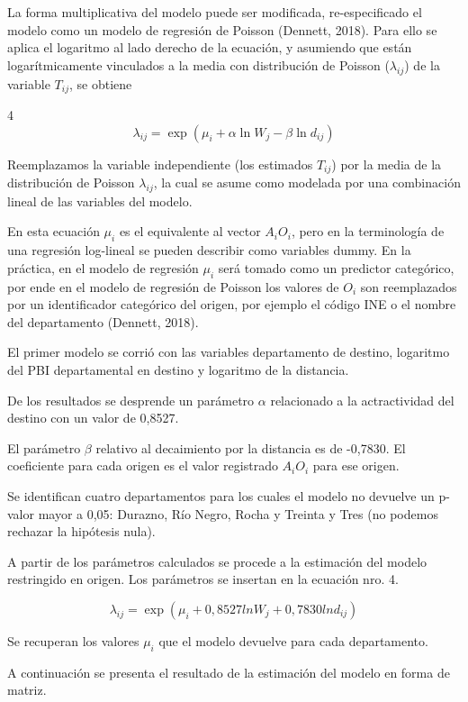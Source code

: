 \documentclass[12pt,spanish,]{article}
\begin{document}
La forma multiplicativa del modelo puede ser modificada, re-especificado
el modelo como un modelo de regresión de Poisson (Dennett, 2018). Para
ello se aplica el logaritmo al lado derecho de la ecuación, y asumiendo
que están logarítmicamente vinculados a la media con distribución de
Poisson (\(\lambda_{ij}\)) de la variable \(T_{ij}\), se obtiene

4
\[ \lambda_{ij} = \exp( \mu_{i} + \alpha \ln W_{j} - \beta \ln d_{ij} )\]

Reemplazamos la variable independiente (los estimados \(T_{ij}\)) por la
media de la distribución de Poisson \(\lambda_{ij}\), la cual se asume
como modelada por una combinación lineal de las variables del modelo.

En esta ecuación \(\mu_{i}\) es el equivalente al vector \(A_{i}O_{i}\),
pero en la terminología de una regresión log-lineal se pueden describir
como variables dummy. En la práctica, en el modelo de regresión
\(\mu_{i}\) será tomado como un predictor categórico, por ende en el
modelo de regresión de Poisson los valores de \(O_{i}\) son reemplazados
por un identificador categórico del origen, por ejemplo el código INE o
el nombre del departamento (Dennett, 2018).

El primer modelo se corrió con las variables departamento de destino,
logaritmo del PBI departamental en destino y logaritmo de la distancia.



De los resultados se desprende un parámetro \(\alpha\) relacionado a la
actractividad del destino con un valor de 0,8527.

El parámetro \(\beta\) relativo al decaimiento por la distancia es de
-0,7830. El coeficiente para cada origen es el valor registrado
\(A_{i}O_{i}\) para ese origen.

Se identifican cuatro departamentos para los cuales el modelo no
devuelve un p-valor mayor a 0,05: Durazno, Río Negro, Rocha y Treinta y
Tres (no podemos rechazar la hipótesis nula).

A partir de los parámetros calculados se procede a la estimación del
modelo restringido en origen. Los parámetros se insertan en la ecuación
nro. 4.

\[ \lambda_{ij} = \exp( \mu_{i} + 0,8527 ln W_{j}  + 0,7830 ln d_{ij} )\]

Se recuperan los valores \(\mu_{i}\) que el modelo devuelve para cada
departamento.

A continuación se presenta el resultado de la estimación del modelo en
forma de matriz.
\end{document}
